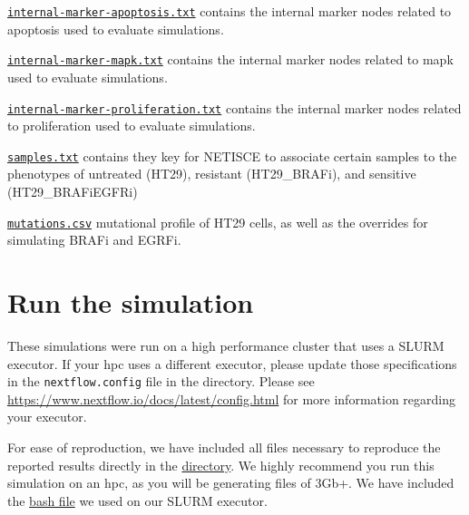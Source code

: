 \documentclass[
]{book}
\begin{document}
\href{https://github.com/VeraLiconaResearchGroup/Netisce/blob/main/colorectal_cancer_validation/input_data/internal-marker-apoptosis.txt}{\texttt{internal-marker-apoptosis.txt}} contains the internal marker nodes related to apoptosis used to evaluate simulations.

\href{https://github.com/VeraLiconaResearchGroup/Netisce/blob/main/colorectal_cancer_validation/input_data/internal-marker-mapk.txt}{\texttt{internal-marker-mapk.txt}} contains the internal marker nodes related to mapk used to evaluate simulations.

\href{https://github.com/VeraLiconaResearchGroup/Netisce/blob/main/colorectal_cancer_validation/input_data/internal-marker-proliferation.txt}{\texttt{internal-marker-proliferation.txt}} contains the internal marker nodes related to proliferation used to evaluate simulations.

\href{https://github.com/VeraLiconaResearchGroup/Netisce/blob/main/colorectal_cancer_validation/input_data/samples.txt}{\texttt{samples.txt}} contains they key for NETISCE to associate certain samples to the phenotypes of untreated (HT29), resistant (HT29\_BRAFi), and sensitive (HT29\_BRAFiEGFRi)

\href{https://github.com/VeraLiconaResearchGroup/Netisce/blob/main/colorectal_cancer_validation/input_data/mutations.csv}{\texttt{mutations.csv}} mutational profile of HT29 cells, as well as the overrides for simulating BRAFi and EGRFi.

\hypertarget{run-the-simulation-2}{%
\section{Run the simulation}\label{run-the-simulation-2}}

These simulations were run on a high performance cluster that uses a SLURM executor. If your hpc uses a different executor, please update those specifications in the \texttt{nextflow.config} file in the directory. Please see \url{https://www.nextflow.io/docs/latest/config.html} for more information regarding your executor.

For ease of reproduction, we have included all files necessary to reproduce the reported results directly in the \href{https://github.com/VeraLiconaResearchGroup/Netisce/tree/main/colorectal_cancer_validation}{directory}. We highly recommend you run this simulation on an hpc, as you will be generating files of 3Gb+. We have included the \href{https://github.com/VeraLiconaResearchGroup/Netisce/blob/main/colorectal_cancer_validation/run.sh}{bash file} we used on our SLURM executor.
\end{document}

